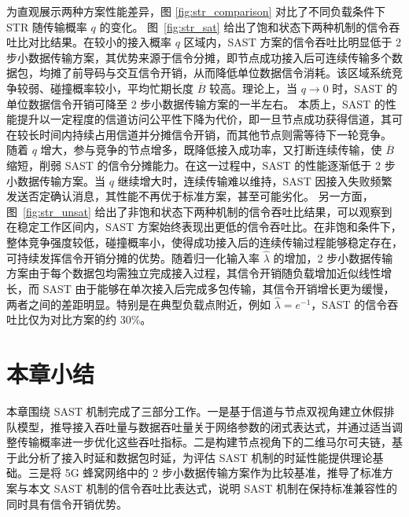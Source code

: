 为直观展示两种方案性能差异，图 \ref{fig:str_comparison} 对比了不同负载条件下 STR 随传输概率 $q$ 的变化。
图~\ref{fig:str_sat} 给出了饱和状态下两种机制的信令吞吐比对比结果。在较小的接入概率 $q$ 区域内，SAST 方案的信令吞吐比明显低于 2 步小数据传输方案，其优势来源于信令分摊，即节点成功接入后可连续传输多个数据包，均摊了前导码与交互信令开销，从而降低单位数据信令消耗。该区域系统竞争较弱、碰撞概率较小，平均忙期长度 $\overline{B}$ 较高。理论上，当 $q \to 0$ 时，SAST 的单位数据信令开销可降至 2 步小数据传输方案的一半左右。
本质上，SAST 的性能提升以一定程度的信道访问公平性下降为代价，即一旦节点成功获得信道，其可在较长时间内持续占用信道并分摊信令开销，而其他节点则需等待下一轮竞争。
随着 $q$ 增大，参与竞争的节点增多，既降低接入成功率，又打断连续传输，使 $\overline{B}$ 缩短，削弱 SAST 的信令分摊能力。在这一过程中，SAST 的性能逐渐低于 2 步小数据传输方案。当 $q$ 继续增大时，连续传输难以维持，SAST 因接入失败频繁发送否定确认消息，其性能不再优于标准方案，甚至可能劣化。
另一方面，图~\ref{fig:str_unsat} 给出了非饱和状态下两种机制的信令吞吐比结果，可以观察到在稳定工作区间内，SAST 方案始终表现出更低的信令吞吐比。在非饱和条件下，整体竞争强度较低，碰撞概率小，使得成功接入后的连续传输过程能够稳定存在，可持续发挥信令开销分摊的优势。随着归一化输入率 $\hat{\lambda}$ 的增加，2 步小数据传输方案由于每个数据包均需独立完成接入过程，其信令开销随负载增加近似线性增长，而 SAST 由于能够在单次接入后完成多包传输，其信令开销增长更为缓慢，两者之间的差距明显。特别是在典型负载点附近，例如 $\hat{\lambda} = e^{-1}$，SAST 的信令吞吐比仅为对比方案的约 30\%。 

\section{本章小结}
\label{sec:sast_conclusion}

本章围绕 SAST 机制完成了三部分工作。一是基于信道与节点双视角建立休假排队模型，推导接入吞吐量与数据吞吐量关于网络参数的闭式表达式，并通过适当调整传输概率进一步优化这些吞吐指标。二是构建节点视角下的二维马尔可夫链，基于此分析了接入时延和数据包时延，为评估 SAST 机制的时延性能提供理论基础。三是将 5G 蜂窝网络中的 2 步小数据传输方案作为比较基准，推导了标准方案与本文 SAST 机制的信令吞吐比表达式，说明 SAST 机制在保持标准兼容性的同时具有信令开销优势。



